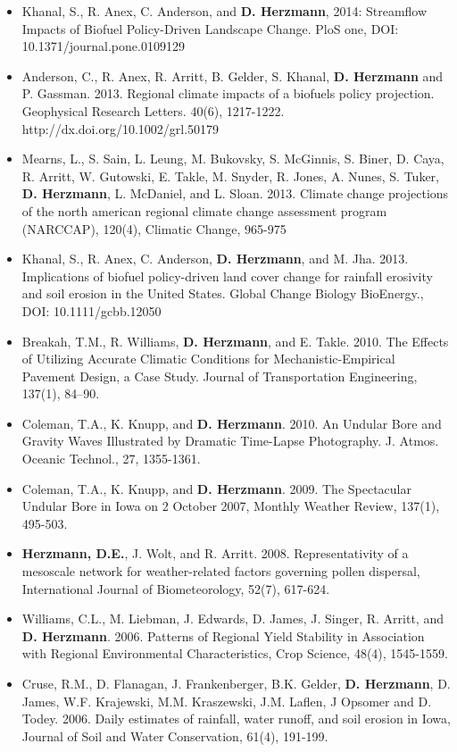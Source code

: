 \begin{itemize}
\item Khanal, S., R. Anex, C. Anderson, and \textbf{D. Herzmann}, 2014: Streamflow Impacts of Biofuel Policy-Driven Landscape Change. PloS one, DOI: 10.1371/journal.pone.0109129
\item Anderson, C., R. Anex, R. Arritt, B. Gelder, S. Khanal, \textbf{D. Herzmann} and P. Gassman. 2013. Regional climate impacts of a biofuels policy projection. Geophysical Research Letters. 40(6), 1217-1222. http://dx.doi.org/10.1002/grl.50179
\item Mearns, L., S. Sain, L. Leung, M. Bukovsky, S. McGinnis, S. Biner, D. Caya, R. Arritt, W. Gutowski, E. Takle, M. Snyder, R. Jones, A. Nunes, S. Tuker, \textbf{D. Herzmann}, L. McDaniel, and L. Sloan. 2013. Climate change projections of the north american regional climate change assessment program (NARCCAP), 120(4), Climatic Change, 965-975
\item Khanal, S., R. Anex, C. Anderson, \textbf{D. Herzmann}, and M. Jha. 2013. Implications of biofuel policy-driven land cover change for rainfall erosivity and soil erosion in the United States. Global Change Biology BioEnergy., DOI: 10.1111/gcbb.12050
\item Breakah, T.M., R. Williams, \textbf{D. Herzmann}, and E. Takle. 2010. The Effects of Utilizing Accurate Climatic Conditions for Mechanistic-Empirical Pavement Design, a Case Study. Journal of Transportation Engineering, 137(1), 84–90.
\item Coleman, T.A., K. Knupp, and \textbf{D. Herzmann}. 2010. An Undular Bore and Gravity Waves Illustrated by Dramatic Time-Lapse Photography. J. Atmos. Oceanic Technol., 27, 1355-1361.
\item Coleman, T.A., K. Knupp, and \textbf{D. Herzmann}. 2009. The Spectacular Undular Bore in Iowa on 2 October 2007, Monthly Weather Review, 137(1), 495-503.
\item \textbf{Herzmann, D.E.}, J. Wolt, and R. Arritt. 2008. Representativity of a mesoscale network for weather-related factors governing pollen dispersal, International Journal of Biometeorology, 52(7), 617-624.
\item Williams, C.L., M. Liebman, J. Edwards, D. James, J. Singer, R. Arritt, and \textbf{D. Herzmann}. 2006. Patterns of Regional Yield Stability in Association with Regional Environmental Characteristics, Crop Science, 48(4), 1545-1559.
\item Cruse, R.M., D. Flanagan, J. Frankenberger, B.K. Gelder, \textbf{D. Herzmann}, D. James, W.F. Krajewski, M.M. Kraszewski, J.M. Laflen, J Opsomer and D. Todey. 2006. Daily estimates of rainfall, water runoff, and soil erosion in Iowa, Journal of Soil and Water Conservation, 61(4), 191-199.
\end{itemize}

